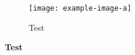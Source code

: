 \documentclass{article}
\begin{document}
\begin{figure}
	\centering
	\texttt{[image: example-image-a]}
	\label{fig:a}
	\caption{Test}
\end{figure}%

\textbf{Test\cite{JensenUltrasoundBook}}
\printbibliography
\end{document}
